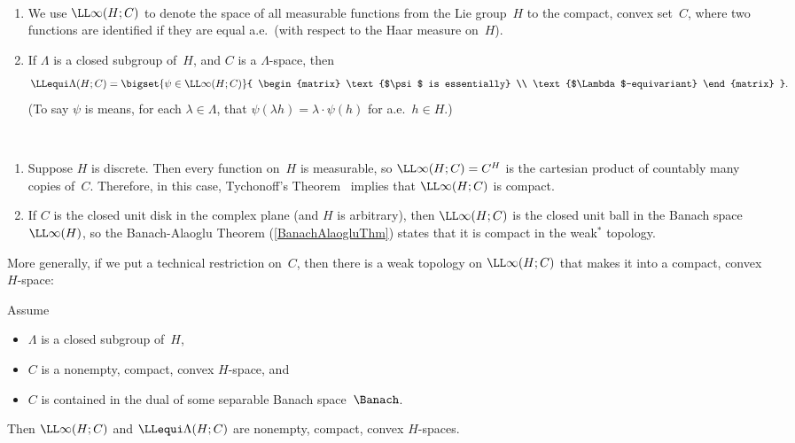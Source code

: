 \begin{notation} \ 
\noprelistbreak
	\begin{enumerate}
	\item We use $\LL\infty(H;C)$ to denote the space of all measurable functions from the Lie group~$H$ to the compact, convex set~$C$, where two functions are identified if they are equal a.e.\ (with respect to the Haar measure on~$H$). 
	\item If $\Lambda$ is a closed subgroup of~$H$, and $C$ is a $\Lambda$-space, then%
		$$ \LLequi\Lambda(H;C) 
		= \bigset{ \psi \in \LL\infty(H;C) }{ 
		\begin{matrix} \text{$\psi$ is essentially} \\ \text{$\Lambda$-equivariant} \end{matrix}
		} .$$
	(To say $\psi$ is  means, for each $\lambda \in \Lambda$, that $\psi(\lambda h) = \lambda \cdot \psi(h)$ for a.e.\ $h \in H$.)
	\end{enumerate}
\end{notation}

\begin{egs} \ 
\noprelistbreak
\begin{enumerate}
\item Suppose $H$ is discrete. Then every function on~$H$ is measurable, so $\LL\infty(H;C) = C^H$ is the cartesian product of countably many copies of~$C$. Therefore, in this case, {Tychonoff's Theorem}~ implies that $\LL\infty(H;C)$ is compact.
\item If $C$ is the closed unit disk in the complex plane (and $H$ is arbitrary), then $\LL\infty(H;C)$ is the closed unit ball in the Banach space $\LL\infty(H)$, so the Banach-Alaoglu Theorem (\cref{BanachAlaogluThm}) states that it is compact in the weak$^*$ topology. 
\end{enumerate}
\end{egs}

More generally, if we put a technical restriction on~$C$, then there is a weak topology on $\LL\infty(H;C)$ that makes it into a compact, convex $H$-space:

\begin{lem} \label{Linfty(H;C)good}
Assume 
\noprelistbreak
	\begin{itemize}
	\item $\Lambda$ is a closed subgroup of~$H$,
	\item $C$ is a nonempty, compact, convex $H$-space,
	and
	\item $C$ is contained in the dual of some separable Banach space~$\Banach$.
	\end{itemize}
Then $\LL\infty(H; C)$ and $\LLequi\Lambda(H; C)$ are nonempty, compact, convex $H$-spaces.
\end{lem}

